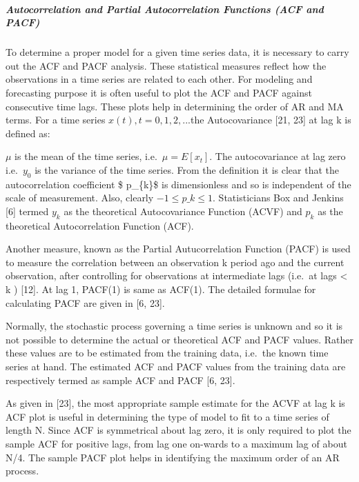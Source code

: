 \documentclass[
  letterpaper,
  DIV=11,
  numbers=noendperiod]{scrartcl}
\let\oldsubparagraph\subparagraph
\renewcommand{\subparagraph}[1]{\oldsubparagraph{#1}\mbox{}}
\begin{document}
\hypertarget{autocorrelation-and-partial-autocorrelation-functions-acf-and-pacf}{%
\subparagraph{\texorpdfstring{\textbf{Autocorrelation and Partial
Autocorrelation Functions (ACF and
PACF)}}{Autocorrelation and Partial Autocorrelation Functions (ACF and PACF)}}\label{autocorrelation-and-partial-autocorrelation-functions-acf-and-pacf}}

To determine a proper model for a given time series data, it is
necessary to carry out the ACF and PACF analysis. These statistical
measures reflect how the observations in a time series are related to
each other. For modeling and forecasting purpose it is often useful to
plot the ACF and PACF against consecutive time lags. These plots help in
determining the order of AR and MA terms. For a time series
\({x(t),t = 0,1, 2,...}\)the Autocovariance {[}21, 23{]} at lag k is
defined as:

\(\mu\) is the mean of the time series,
i.e.~\(\mu = E\left[x_{t}\right]\). The autocovariance at lag zero
i.e.~\(y_{0}\) is the variance of the time series. From the definition
it is clear that the autocorrelation coefficient \$ p\_\{k\}\$ is
dimensionless and so is independent of the scale of measurement. Also,
clearly \(-1 \leq p\_{k}\leq 1\). Statisticians Box and Jenkins {[}6{]}
termed \(y_{k }\) as the theoretical Autocovariance Function (ACVF) and
\(p_{k}\) as the theoretical Autocorrelation Function (ACF).

Another measure, known as the Partial Autucorrelation Function (PACF) is
used to measure the correlation between an observation k period ago and
the current observation, after controlling for observations at
intermediate lags (i.e.~at lags \textless{} k ) {[}12{]}. At lag 1,
PACF(1) is same as ACF(1). The detailed formulae for calculating PACF
are given in {[}6, 23{]}.

Normally, the stochastic process governing a time series is unknown and
so it is not possible to determine the actual or theoretical ACF and
PACF values. Rather these values are to be estimated from the training
data, i.e.~the known time series at hand. The estimated ACF and PACF
values from the training data are respectively termed as sample ACF and
PACF {[}6, 23{]}.

As given in {[}23{]}, the most appropriate sample estimate for the ACVF
at lag k is ACF plot is useful in determining the type of model to fit
to a time series of length N. Since ACF is symmetrical about lag zero,
it is only required to plot the sample ACF for positive lags, from lag
one on-wards to a maximum lag of about N/4. The sample PACF plot helps
in identifying the maximum order of an AR process.
\end{document}
